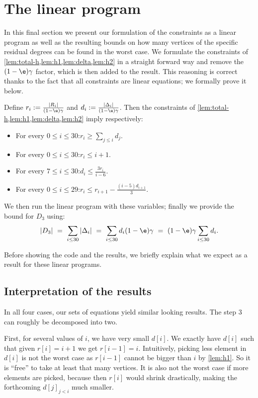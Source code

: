 
\section{The linear program}\label{sec:linear-prog}

In this final section we present our formulation of the constraints as a
linear program as well as the resulting bounds on how many vertices of
the specific residual degrees can be found in the worst case.
We formulate the constraints of \cref{lem:total-h,lem:h1,lem:delta,lem:h2} in a
straight forward way and remove the
$(1-\e)\gamma$ factor, which is then added to the result.
%
This reasoning is correct thanks to the fact that all constraints are linear
equations; we formally prove it below.

\smallskip
Define $r_i := \frac{|R_i|}{(1-\e)\gamma}$ and  $d_i:=\frac{|\Delta_i|}{(1-\e)\gamma}$.
Then the constraints of \cref{lem:total-h,lem:h1,lem:delta,lem:h2} imply respectively:
\begin{itemize}
  \item For every $0\le i\le 30$:\quad $r_i \ge \sum\limits_{j\le i} d_j$.\\ \smallskip
  \item For every $0\le i\le 30$:\quad $r_i \le i+1$.\\ \smallskip
  \item For every $7\le i\le 30$:\quad $d_i \le \frac{3 r_i}{i-6}$.\\ \smallskip
  \item For every $0\le i\le 29$:\quad $r_i \le r_{i+1} - \frac{(i-5)d_{i+1}}{3}$.
\end{itemize}

We then run the linear program with these variables; finally we provide the bound for $D_3$ using:
\[|D_3| ~=~ \sum\limits_{i\le 30} |\Delta_i|
~=~ \sum\limits_{i\le 30} d_i(1-\e)\gamma
~=~ (1-\e)\gamma\sum\limits_{i\le 30}d_i.\]

Before showing the code and the results, we briefly explain what we expect as a
result for these linear programs.

\subsection{Interpretation of the results}
In all four cases, our sets of equations yield similar looking results.
The step $3$ can roughly be decomposed into two.

First, for several values of
$i$, we have very small $d[i]$. We exactly have $d[i]$ such that
given $r[i]=i+1$ we get $r[i-1]=i$. Intuitively, picking less element in $d[i]$
is not the worst case as $r[i-1]$ cannot be bigger than $i$ by \cref{lem:h1}.
So it is ``free'' to take at least that many vertices.
It is also not the worst case if more elements are picked, because then $r[i]$
would shrink drastically, making the forthcoming $d[j]_{j<i}$ much smaller.

